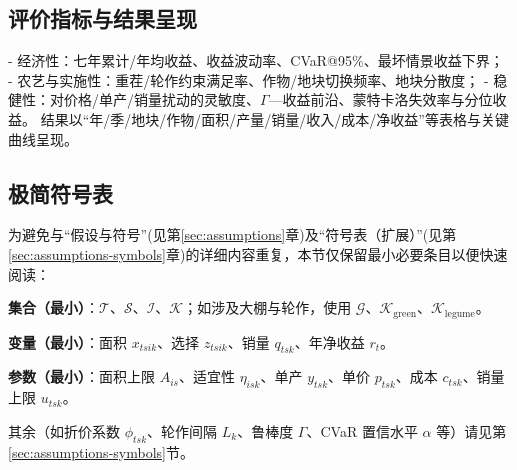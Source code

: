 \subsection{评价指标与结果呈现}
- 经济性：七年累计/年均收益、收益波动率、CVaR@95\%、最坏情景收益下界；
- 农艺与实施性：重茬/轮作约束满足率、作物/地块切换频率、地块分散度；
- 稳健性：对价格/单产/销量扰动的灵敏度、\(\Gamma\)—收益前沿、蒙特卡洛失效率与分位收益。
结果以“年/季/地块/作物/面积/产量/销量/收入/成本/净收益”等表格与关键曲线呈现。

\subsection{极简符号表}
为避免与“假设与符号”(见第\ref{sec:assumptions}章)及“符号表（扩展）”(见第\ref{sec:assumptions-symbols}章)的详细内容重复，本节仅保留最小必要条目以便快速阅读：

\noindent\textbf{集合（最小）}：\(\mathcal{T}\)、\(\mathcal{S}\)、\(\mathcal{I}\)、\(\mathcal{K}\)；如涉及大棚与轮作，使用 \(\mathcal{G}\)、\(\mathcal{K}_{\mathrm{green}}\)、\(\mathcal{K}_{\mathrm{legume}}\)。

\noindent\textbf{变量（最小）}：面积 \(x_{t s i k}\)、选择 \(z_{t s i k}\)、销量 \(q_{t s k}\)、年净收益 \(r_t\)。

\noindent\textbf{参数（最小）}：面积上限 \(A_{i s}\)、适宜性 \(\eta_{i s k}\)、单产 \(y_{t s k}\)、单价 \(p_{t s k}\)、成本 \(c_{t s k}\)、销量上限 \(u_{t s k}\)。

\noindent 其余（如折价系数 \(\phi_{t s k}\)、轮作间隔 \(L_k\)、鲁棒度 \(\Gamma\)、CVaR 置信水平 \(\alpha\) 等）请见第\ref{sec:assumptions-symbols}节。